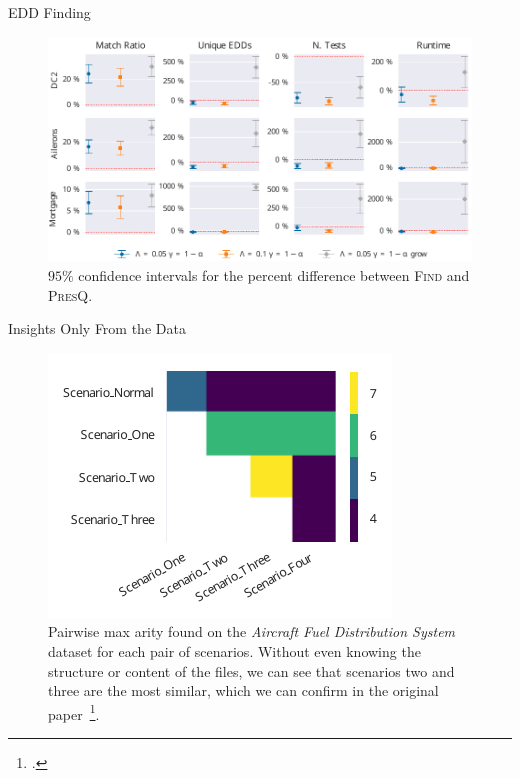 \documentclass[10pt]{beamer}
\newcommand{\PresQ}[0]{\textsc{PresQ}\xspace}
\begin{document}
\begin{frame}{EDD Finding}
\begin{figure}
    \centering
    \includegraphics[width=\textwidth]{all}
    \caption{$95\%$ confidence intervals for the percent difference
    between \textsc{Find} and \PresQ.}
\end{figure}

\end{frame}

\begin{frame}{Insights Only From the Data}
\begin{figure}
    \centering
    \includegraphics{afds}
    \caption{
        Pairwise max arity found on the \emph{Aircraft Fuel Distribution System} dataset for each pair of scenarios.
        Without even knowing the structure or content of the files, we can see that
        scenarios two and three are the most similar, which we can confirm in the
        original paper~\footcite{Gheraibia2019}.
    }
\end{figure}
\end{frame}
\end{document}
